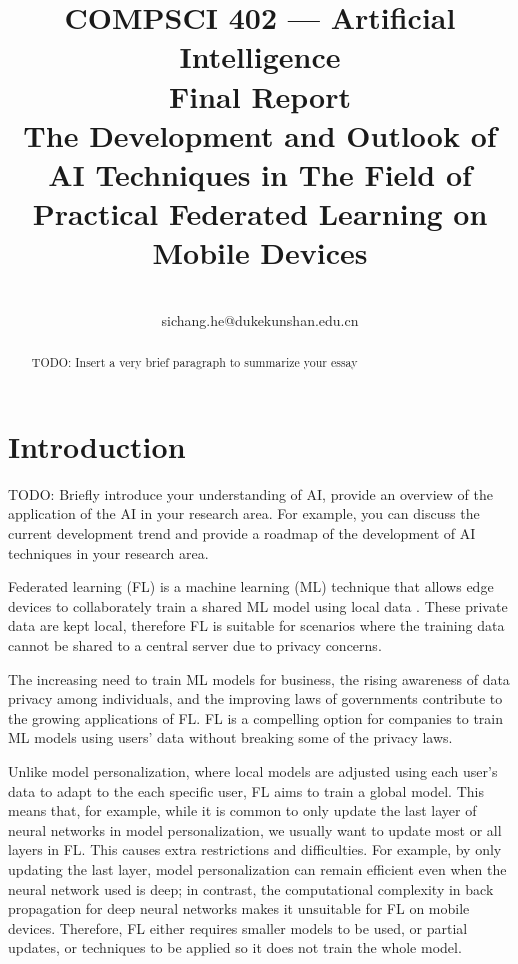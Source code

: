 \documentclass[conference]{IEEEtran}
\begin{document}
\title{
    COMPSCI 402 --- Artificial Intelligence\\
    Final Report\\
    The Development and Outlook of AI Techniques in The Field of
    Practical Federated Learning on Mobile Devices
}

\author{
    \\
    sichang.he@dukekunshan.edu.cn
}

\maketitle

\begin{abstract}
TODO: Insert a very brief paragraph to summarize your essay
\end{abstract}

\section{Introduction}

TODO: Briefly introduce your understanding of AI,
provide an overview of the application of the AI in your research area.
For example, you can discuss the current development trend and
provide a roadmap of the development of AI techniques in your research area.

Federated learning (FL) is a machine learning (ML) technique that
allows edge devices to collaborately train a shared ML model using
local data \cite{bonawitz2019towards}.
These private data are kept local,
therefore FL is suitable for scenarios where
the training data cannot be shared to a central server due to privacy concerns.

The increasing need to train ML models for business,
the rising awareness of data privacy among individuals,
and the improving laws of governments contribute to
the growing applications of FL.
FL is a compelling option for companies to train ML models using users' data
without breaking some of the privacy laws.

Unlike model personalization,
where local models are adjusted using each user's data to
adapt to the each specific user,
FL aims to train a global model.
This means that, for example,
while it is common to only update the last layer of neural networks in
model personalization,
we usually want to update most or all layers in FL.
This causes extra restrictions and difficulties.
For example, by only updating the last layer,
model personalization can remain efficient even when
the neural network used is deep;
in contrast, the computational complexity in back propagation for
deep neural networks makes it unsuitable for FL on mobile devices.
Therefore, FL either requires smaller models to be used,
or partial updates,
or techniques to be applied so it does not train the whole model.
\end{document}
